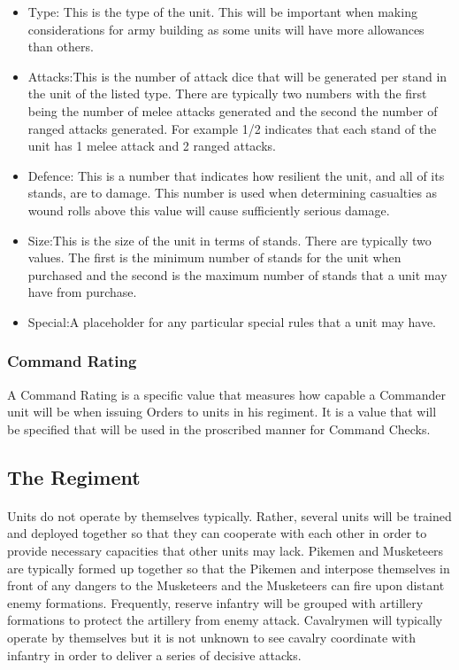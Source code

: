 \documentclass{article}
\begin{document}
\begin{itemize}
\item Type: This is the type of the unit. This will be important when making considerations for army building as some units will have more allowances than others.
\item Attacks:This is the number of attack dice that will be generated per stand in the unit of the listed type. There are typically two numbers with the first being the number of melee attacks generated and the second the number of ranged attacks generated. For example 1/2 indicates that each stand of the unit has 1 melee attack and 2 ranged attacks.
\item Defence: This is a number that indicates how resilient the unit, and all of its stands, are to damage. This number is used when determining casualties as wound rolls above this value will cause sufficiently serious damage.
\item Size:This is the size of the unit in terms of stands. There are typically two values. The first is the minimum number of stands for the unit when purchased and the second is the maximum number of stands that a unit may have from purchase.
\item Special:A placeholder for any particular special rules that a unit may have.
\end{itemize}

\subsubsection{Command Rating}
A Command Rating is a specific value that measures how capable a Commander unit will be when issuing Orders to units in his regiment. It is a value that will be specified that will be used in the proscribed manner for Command Checks.
\subsection{The Regiment}
\paragraph{}
Units do not operate by themselves typically. Rather, several units will be trained and deployed together so that they can cooperate with each other in order to provide necessary capacities that other units may lack. Pikemen and Musketeers are typically formed up together so that the Pikemen and interpose themselves in front of any dangers to the Musketeers and the Musketeers can fire upon distant enemy formations. Frequently, reserve infantry will be grouped with artillery formations to protect the artillery from enemy attack. Cavalrymen will typically operate by themselves but it is not unknown to see cavalry coordinate with infantry in order to deliver a series of decisive attacks.
\end{document}
